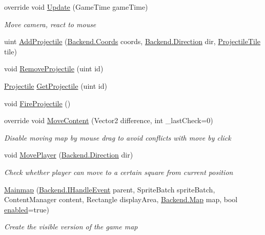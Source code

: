 \begin{DoxyCompactItemize}
\item 
override void \hyperlink{class_gruppe22_1_1_client_1_1_mainmap_aae564d34ea6375ae7538699c14006e0a}{Update} (Game\-Time game\-Time)
\begin{DoxyCompactList}\small\item\em Move camera, react to mouse \end{DoxyCompactList}\item 
uint \hyperlink{class_gruppe22_1_1_client_1_1_mainmap_a094fdb3d9a640b023d8d5b8141008116}{Add\-Projectile} (\hyperlink{class_gruppe22_1_1_backend_1_1_coords}{Backend.\-Coords} coords, \hyperlink{namespace_gruppe22_1_1_backend_a2d53d5d14b8ea0951ba6971e5da1ebf5}{Backend.\-Direction} dir, \hyperlink{class_gruppe22_1_1_projectile_tile}{Projectile\-Tile} tile)
\item 
void \hyperlink{class_gruppe22_1_1_client_1_1_mainmap_a89080aef56b9428f2a0fab05a675eb07}{Remove\-Projectile} (uint id)
\item 
\hyperlink{class_gruppe22_1_1_client_1_1_projectile}{Projectile} \hyperlink{class_gruppe22_1_1_client_1_1_mainmap_a71ee6cf7e84b63a5f334ba7eedf55476}{Get\-Projectile} (uint id)
\item 
void \hyperlink{class_gruppe22_1_1_client_1_1_mainmap_a744dd8cd83091b23cf44b968937f513c}{Fire\-Projectile} ()
\item 
override void \hyperlink{class_gruppe22_1_1_client_1_1_mainmap_a5aacac737e9a500f6c2b5492ce1a9f71}{Move\-Content} (Vector2 difference, int \-\_\-last\-Check=0)
\begin{DoxyCompactList}\small\item\em Disable moving map by mouse drag to avoid conflicts with move by click \end{DoxyCompactList}\item 
void \hyperlink{class_gruppe22_1_1_client_1_1_mainmap_aa05339d33c57fa642006a430f6ab35f7}{Move\-Player} (\hyperlink{namespace_gruppe22_1_1_backend_a2d53d5d14b8ea0951ba6971e5da1ebf5}{Backend.\-Direction} dir)
\begin{DoxyCompactList}\small\item\em Check whether player can move to a certain square from current position \end{DoxyCompactList}\item 
\hyperlink{class_gruppe22_1_1_client_1_1_mainmap_a9740c0af18e7fb685f0bab990f082ac2}{Mainmap} (\hyperlink{interface_gruppe22_1_1_backend_1_1_i_handle_event}{Backend.\-I\-Handle\-Event} parent, Sprite\-Batch sprite\-Batch, Content\-Manager content, Rectangle display\-Area, \hyperlink{class_gruppe22_1_1_backend_1_1_map}{Backend.\-Map} map, bool \hyperlink{class_gruppe22_1_1_client_1_1_mainmap_a05d1ac6585e8e336a812443bfead1617}{enabled}=true)
\begin{DoxyCompactList}\small\item\em Create the visible version of the game map \end{DoxyCompactList}\end{DoxyCompactItemize}
